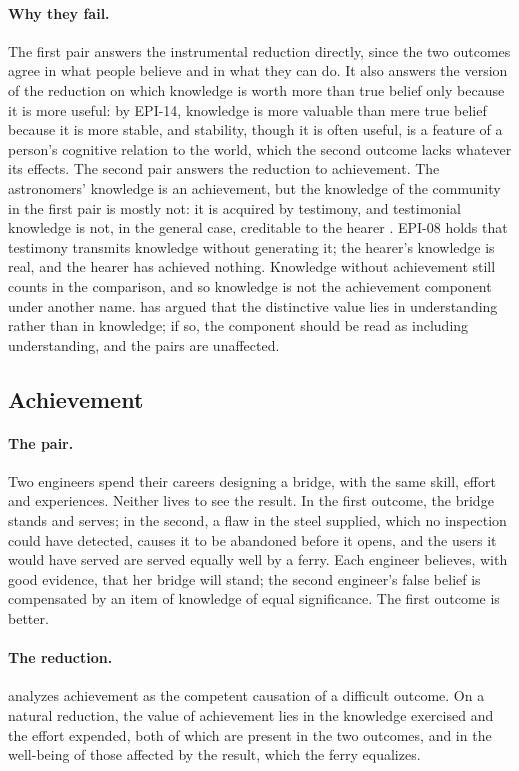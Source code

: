 \documentclass{situationist-preprint}
\begin{document}
\paragraph{Why they fail.} The first pair answers the instrumental reduction directly, since the two outcomes agree in what people believe and in what they can do. It also answers the version of the reduction on which knowledge is worth more than true belief only because it is more useful: by EPI-14, knowledge is more valuable than mere true belief because it is more stable, and stability, though it is often useful, is a feature of a person's cognitive relation to the world, which the second outcome lacks whatever its effects. The second pair answers the reduction to achievement. The astronomers' knowledge is an achievement, but the knowledge of the community in the first pair is mostly not: it is acquired by testimony, and testimonial knowledge is not, in the general case, creditable to the hearer \citep{Lackey2007}. EPI-08 holds that testimony transmits knowledge without generating it; the hearer's knowledge is real, and the hearer has achieved nothing. Knowledge without achievement still counts in the comparison, and so knowledge is not the achievement component under another name. \citet{Kvanvig2003} has argued that the distinctive value lies in understanding rather than in knowledge; if so, the component should be read as including understanding, and the pairs are unaffected.

\subsection{Achievement}

\paragraph{The pair.} Two engineers spend their careers designing a bridge, with the same skill, effort and experiences. Neither lives to see the result. In the first outcome, the bridge stands and serves; in the second, a flaw in the steel supplied, which no inspection could have detected, causes it to be abandoned before it opens, and the users it would have served are served equally well by a ferry. Each engineer believes, with good evidence, that her bridge will stand; the second engineer's false belief is compensated by an item of knowledge of equal significance. The first outcome is better.

\paragraph{The reduction.} \citet{Bradford2015} analyzes achievement as the competent causation of a difficult outcome. On a natural reduction, the value of achievement lies in the knowledge exercised and the effort expended, both of which are present in the two outcomes, and in the well-being of those affected by the result, which the ferry equalizes.
\end{document}
